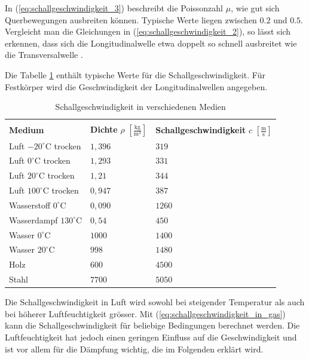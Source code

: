 In (\ref{eq:schallgeschwindigkeit_3}) beschreibt die Poissonzahl $\mu $, wie gut sich Querbewegungen ausbreiten können. Typische Werte liegen zwischen $0.2$ und $0.5$. Vergleicht man die Gleichungen in (\ref{eq:schallgeschwindigkeit_2}), so lässt sich erkennen, dass sich die Longitudinalwelle etwa doppelt so schnell ausbreitet wie die Transversalwelle \cite{LOOSER}.

Die Tabelle \ref{table:schallgeschwindigkeit} enthält typische Werte für die Schallgeschwindigkeit. Für Festkörper wird die Geschwindigkeit der Longitudinalwellen angegeben.

\begin{table}
\begin{center}
\begin{tabular}{|p{}|p{}|p{}|}
\hline
					&				&						 \\[-3mm]
\textbf{Medium}				& \textbf{Dichte} $\rho$ $\left[\mathrm{\frac{kg}{m^{3}}}\right]$	& \textbf{Schallgeschwindigkeit} $c$ $\left[\mathrm{\frac{m}{s}}\right]$\\[2mm]
\hline
Luft $-20^\circ\text{C}	$ trocken	& $1,396$	& $319$\\
Luft $0^\circ\text{C}	$ trocken	& $1,293$	& $331$\\
Luft $20^\circ\text{C}	$ trocken	& $1,21$	& $344$\\
Luft $100^\circ\text{C}$ trocken	& $0,947$	& $387$\\
Wasserstoff $0^\circ\text{C}$		& $0,090$	& $1260$\\
Wasserdampf $130^\circ\text{C}$		& $0,54$	& $450$\\
Wasser $0^\circ\text{C}$		& $1000$	& $1400$\\
Wasser $20^\circ\text{C}$		& $998$		& $1480$\\
Holz					& $600$		& $4500$\\
Stahl					& $7700$	& $5050$\\
\hline
\end{tabular}
\caption{Schallgeschwindigkeit in verschiedenen Medien \cite{HERING}}
\label{table:schallgeschwindigkeit}
\end{center}
\end{table}


Die Schallgeschwindigkeit in Luft wird sowohl bei steigender Temperatur als auch bei höherer Luftfeuchtigkeit grösser. Mit (\ref{eq:schallgeschwindigkeit_in_gas}) kann die Schallgeschwindigkeit für beliebige Bedingungen berechnet werden. Die Luftfeuchtigkeit hat jedoch einen geringen Einfluss auf die Geschwindigkeit und ist vor allem für die Dämpfung wichtig, die im Folgenden erklärt wird.

